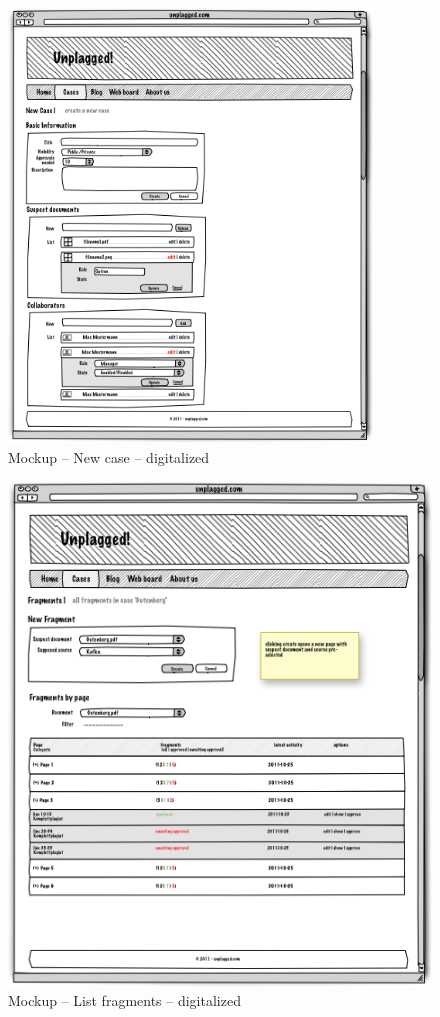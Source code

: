\begin{appendix}
\begin{figure}[tbp]
  \centering
    \includegraphics[width=0.86\textwidth]{mockups/1_new_case.png}
  \caption{Mockup – New case – digitalized }
  \label{fig:1newCaseMockup}
\end{figure}

\begin{figure}[tbp]
  \centering
    \includegraphics[width=\textwidth]{mockups/2_list_fragments.png}
  \caption{Mockup – List fragments – digitalized }
  \label{fig:2listFragmentsMockup}
\end{figure}


\end{appendix}
